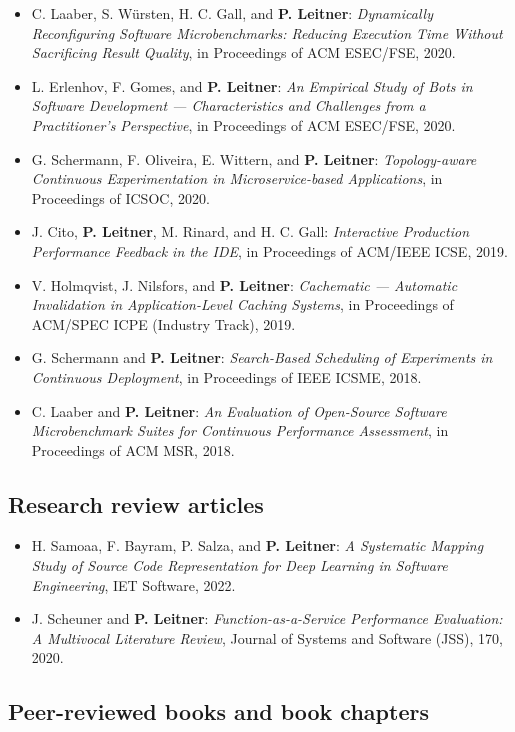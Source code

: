 \documentclass[a4paper,11pt]{article}
\begin{document}
\begin{itemize}[itemsep=0.2em]
\item C. Laaber, S. W\"{u}rsten, H. C. Gall, and \textbf{P. Leitner}: \emph{Dynamically Reconfiguring Software Microbenchmarks: Reducing Execution Time Without Sacrificing Result Quality}, in Proceedings of ACM ESEC/FSE, 2020.
\item L. Erlenhov, F. Gomes, and \textbf{P. Leitner}: \emph{An Empirical Study of Bots in Software Development --- Characteristics and Challenges from a Practitioner's Perspective}, in Proceedings of ACM ESEC/FSE, 2020.
\item G. Schermann, F. Oliveira, E. Wittern, and \textbf{P. Leitner}: \emph{Topology-aware Continuous Experimentation in Microservice-based Applications}, in Proceedings of ICSOC, 2020.
\item J. Cito, \textbf{P. Leitner}, M. Rinard, and H. C. Gall: \emph{Interactive Production Performance Feedback in the IDE}, in Proceedings of ACM/IEEE ICSE, 2019.
\item V. Holmqvist, J. Nilsfors, and \textbf{P. Leitner}: \emph{Cachematic --- Automatic Invalidation in Application-Level Caching Systems}, in Proceedings of ACM/SPEC ICPE (Industry Track), 2019.
\item G. Schermann and \textbf{P. Leitner}: \emph{Search-Based Scheduling of Experiments in Continuous Deployment}, in Proceedings of IEEE ICSME, 2018.
\item C. Laaber and \textbf{P. Leitner}: \emph{An Evaluation of Open-Source Software Microbenchmark Suites for Continuous Performance Assessment}, in Proceedings of ACM MSR, 2018.
\end{itemize}

\subsection{Research review articles}

\begin{itemize}[itemsep=0.2em]
\item H. Samoaa, F. Bayram, P. Salza, and \textbf{P. Leitner}: \emph{A Systematic Mapping Study of Source Code Representation for Deep Learning in Software Engineering}, IET Software, 2022.
\item J. Scheuner and \textbf{P. Leitner}: \emph{Function-as-a-Service Performance Evaluation: A Multivocal Literature Review}, Journal of Systems and Software (JSS), 170, 2020.
\end{itemize}

\subsection{Peer-reviewed books and book chapters}
\end{document}
